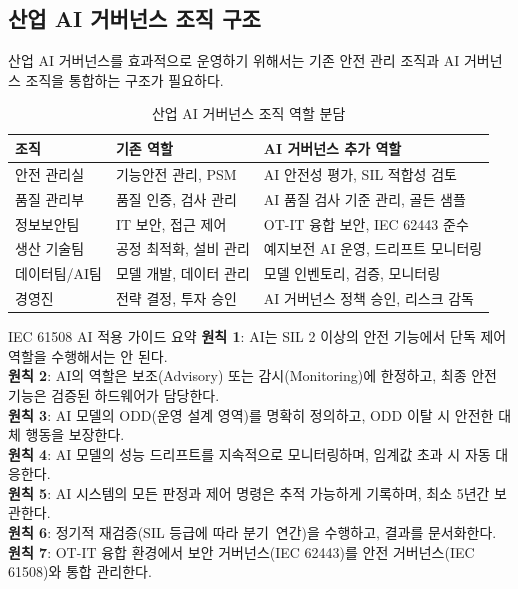 \subsection{산업 AI 거버넌스 조직 구조}
\label{sec:19.4.5}

산업 AI 거버넌스를 효과적으로 운영하기 위해서는 기존 안전 관리 조직과 AI 거버넌스 조직을 통합하는 구조가 필요하다.

\begin{table}[htbp]
\centering
\caption{산업 AI 거버넌스 조직 역할 분담}
\label{tab:19_org}
\begin{tabularx}{\textwidth}{p{3cm}p{3cm}X}
\toprule
\textbf{조직} & \textbf{기존 역할} & \textbf{AI 거버넌스 추가 역할} \\
\midrule
안전 관리실 & 기능안전 관리, PSM & AI 안전성 평가, SIL 적합성 검토 \\
품질 관리부 & 품질 인증, 검사 관리 & AI 품질 검사 기준 관리, 골든 샘플 \\
정보보안팀 & IT 보안, 접근 제어 & OT-IT 융합 보안, IEC 62443 준수 \\
생산 기술팀 & 공정 최적화, 설비 관리 & 예지보전 AI 운영, 드리프트 모니터링 \\
데이터팀/AI팀 & 모델 개발, 데이터 관리 & 모델 인벤토리, 검증, 모니터링 \\
경영진 & 전략 결정, 투자 승인 & AI 거버넌스 정책 승인, 리스크 감독 \\
\bottomrule
\end{tabularx}
\end{table}

\begin{practicaltool}{IEC 61508 AI 적용 가이드 요약}
\textbf{원칙 1}: AI는 SIL 2 이상의 안전 기능에서 단독 제어 역할을 수행해서는 안 된다.\\
\textbf{원칙 2}: AI의 역할은 보조(Advisory) 또는 감시(Monitoring)에 한정하고, 최종 안전 기능은 검증된 하드웨어가 담당한다.\\
\textbf{원칙 3}: AI 모델의 ODD(운영 설계 영역)를 명확히 정의하고, ODD 이탈 시 안전한 대체 행동을 보장한다.\\
\textbf{원칙 4}: AI 모델의 성능 드리프트를 지속적으로 모니터링하며, 임계값 초과 시 자동 대응한다.\\
\textbf{원칙 5}: AI 시스템의 모든 판정과 제어 명령은 추적 가능하게 기록하며, 최소 5년간 보관한다.\\
\textbf{원칙 6}: 정기적 재검증(SIL 등급에 따라 분기~연간)을 수행하고, 결과를 문서화한다.\\
\textbf{원칙 7}: OT-IT 융합 환경에서 보안 거버넌스(IEC 62443)를 안전 거버넌스(IEC 61508)와 통합 관리한다.
\end{practicaltool}

